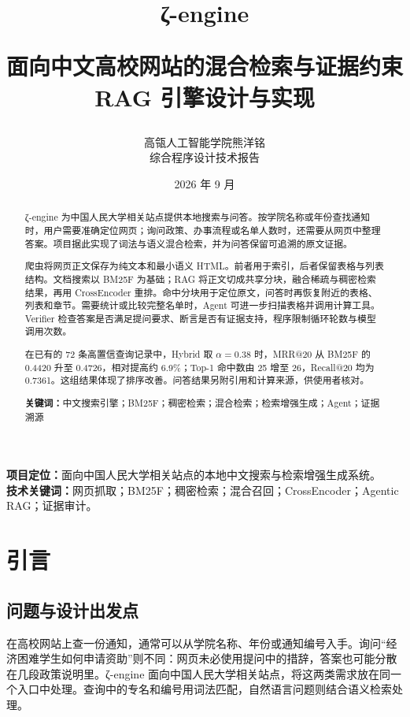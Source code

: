\documentclass[UTF8,zihao=-4,fontset=fandol]{ctexart}
\title{\bfseries\Huge ζ-engine\par\vspace{0.5em}
  \LARGE 面向中文高校网站的混合检索与证据约束 RAG 引擎设计与实现}
\author{高瓴人工智能学院\quad 熊洋铭\\[0.5em]\large 综合程序设计技术报告}
\date{2026 年 9 月}
\newcommand{\project}{ζ-engine}
\newcommand{\keywords}[1]{\par\noindent\textbf{关键词：}#1}
\begin{document}
\maketitle
\thispagestyle{empty}
\vfill
\begin{center}
\begin{minipage}{0.82\textwidth}
\small
\textbf{项目定位：}面向中国人民大学相关站点的本地中文搜索与检索增强生成系统。\\
\textbf{技术关键词：}网页抓取；BM25F；稠密检索；混合召回；CrossEncoder；Agentic RAG；证据审计。
\end{minipage}
\end{center}
\vfill
\clearpage

\begin{abstract}
\project{} 为中国人民大学相关站点提供本地搜索与问答。按学院名称或年份查找通知时，用户需要准确定位网页；询问政策、办事流程或名单人数时，还需要从网页中整理答案。项目据此实现了词法与语义混合检索，并为问答保留可追溯的原文证据。

爬虫将网页正文保存为纯文本和最小语义 HTML。前者用于索引，后者保留表格与列表结构。文档搜索以 BM25F 为基础；RAG 将正文切成共享分块，融合稀疏与稠密检索结果，再用 CrossEncoder 重排。命中分块用于定位原文，问答时再恢复附近的表格、列表和章节。需要统计或比较完整名单时，Agent 可进一步扫描表格并调用计算工具。Verifier 检查答案是否满足提问要求、断言是否有证据支持，程序限制循环轮数与模型调用次数。

在已有的 72 条高置信查询记录中，Hybrid 取 $\alpha=0.38$ 时，MRR@20 从 BM25F 的 0.4420 升至 0.4726，相对提高约 6.9\%；Top-1 命中数由 25 增至 26，Recall@20 均为 0.7361。这组结果体现了排序改善。问答结果另附引用和计算来源，供使用者核对。

\keywords{中文搜索引擎；BM25F；稠密检索；混合检索；检索增强生成；Agent；证据溯源}
\end{abstract}

\clearpage
\tableofcontents
\clearpage

\section{引言}

\subsection{问题与设计出发点}

在高校网站上查一份通知，通常可以从学院名称、年份或通知编号入手。询问“经济困难学生如何申请资助”则不同：网页未必使用提问中的措辞，答案也可能分散在几段政策说明里。\project{} 面向中国人民大学相关站点，将这两类需求放在同一个入口中处理。查询中的专名和编号用词法匹配，自然语言问题则结合语义检索处理。
\end{document}
